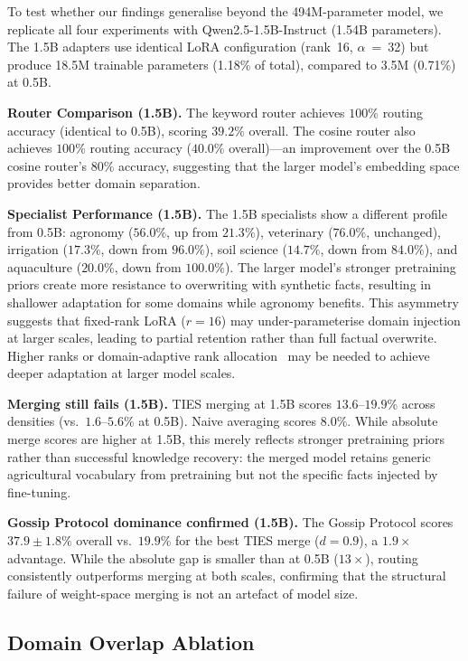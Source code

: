 \documentclass[conference, 10pt]{IEEEtran}
\begin{document}
To test whether our findings generalise beyond the 494M-parameter model,
we replicate all four experiments with Qwen2.5-1.5B-Instruct (1.54B
parameters). The 1.5B adapters use identical LoRA configuration
(rank~16, $\alpha$~=~32) but produce 18.5M trainable parameters
(1.18\% of total), compared to 3.5M (0.71\%) at 0.5B.

\textbf{Router Comparison (1.5B).}
The keyword router achieves $100\%$ routing accuracy (identical to 0.5B),
scoring $39.2\%$ overall. The cosine router also achieves $100\%$
routing accuracy ($40.0\%$ overall)---an improvement over the 0.5B
cosine router's $80\%$ accuracy, suggesting that the larger model's
embedding space provides better domain separation.

\textbf{Specialist Performance (1.5B).}
The 1.5B specialists show a different profile from 0.5B:
agronomy ($56.0\%$, up from $21.3\%$), veterinary ($76.0\%$, unchanged),
irrigation ($17.3\%$, down from $96.0\%$), soil science ($14.7\%$,
down from $84.0\%$), and aquaculture ($20.0\%$, down from $100.0\%$).
The larger model's stronger pretraining priors create more resistance
to overwriting with synthetic facts, resulting in shallower adaptation
for some domains while agronomy benefits.
This asymmetry suggests that fixed-rank LoRA ($r = 16$) may
under-parameterise domain injection at larger scales, leading to
partial retention rather than full factual overwrite.
Higher ranks or domain-adaptive rank allocation~\cite{zhang2023adalora}
may be needed to achieve deeper adaptation at larger model scales.

\textbf{Merging still fails (1.5B).}
TIES merging at 1.5B scores $13.6$--$19.9\%$ across densities
(vs.\ $1.6$--$5.6\%$ at 0.5B). Naive averaging scores $8.0\%$.
While absolute merge scores are higher at 1.5B, this merely reflects
stronger pretraining priors rather than successful knowledge recovery:
the merged model retains generic agricultural vocabulary from
pretraining but not the specific facts injected by fine-tuning.

\textbf{Gossip Protocol dominance confirmed (1.5B).}
The Gossip Protocol scores $37.9 \pm 1.8\%$ overall vs.\ $19.9\%$
for the best TIES merge ($d = 0.9$), a $1.9\times$ advantage.
While the absolute gap is smaller than at 0.5B ($13\times$), routing
consistently outperforms merging at both scales, confirming that the
structural failure of weight-space merging is not an artefact of
model size.

\subsection{Domain Overlap Ablation}
\label{sec:overlap-ablation}
\end{document}
